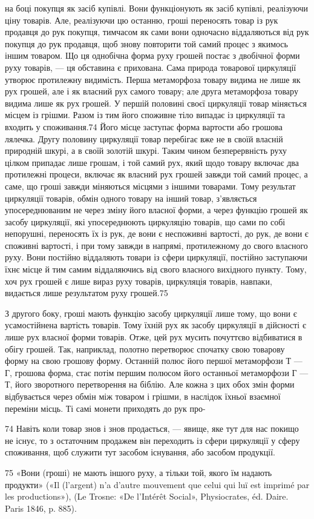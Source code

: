 на боці покупця як засіб купівлі. Вони функціонують як засіб
купівлі, реалізуючи ціну товарів. Але, реалізуючи цю останню,
гроші переносять товар із рук продавця до рук покупця, тимчасом
як сами вони одночасно віддаляються від рук покупця до
рук продавця, щоб знову повторити той самий процес з якимось
іншим товаром. Що ця однобічна форма руху грошей постає з
двобічної форми руху товарів, — ця обставина є прихована. Сама
природа товарової циркуляції утворює протилежну видимість.
Перша метаморфоза товару видима не лише як рух грошей, але
і як власний рух самого товару; але друга метаморфоза товару
видима лише як рух грошей. У першій половині своєї циркуляції
товар міняється місцем із грішми. Разом із тим його споживне
тіло випадає із циркуляції та входить у споживання.74 Його
місце заступає форма вартости або грошова лялечка. Другу
половину циркуляції товар перебігає вже не в своїй власній
природній шкурі, а в своїй золотій шкурі. Таким чином безперервність
руху цілком припадає лише грошам, і той самий рух,
який щодо товару включає два протилежні процеси, включає як
власний рух грошей завжди той самий процес, а саме, що гроші
завжди міняються місцями з іншими товарами. Тому результат
циркуляції товарів, обмін одного товару на інший товар, з’являється
упосереднюваним не через зміну його власної форми, а
через функцію грошей як засобу циркуляції, які упосереднюють
циркуляцію товарів, що сами по собі непорушні, переносять їх
із рук, де вони є неспоживні вартості, до рук, де вони є споживні
вартості, і при тому завжди в напрямі, протилежному до свого
власного руху. Вони постійно віддаляють товари із сфери циркуляції,
постійно заступаючи їхнє місце й тим самим віддаляючись
від свого власного вихідного пункту. Тому, хоч рух грошей є
лише вираз руху товарів, циркуляція товарів, навпаки, видається
лише результатом руху грошей.75

З другого боку, гроші мають функцію засобу циркуляції
лише тому, що вони є усамостійнена вартість товарів. Тому їхній
рух як засобу циркуляції в дійсності є лише рух власної форми
товарів. Отже, цей рух мусить почуттєво відбиватися в обігу
грошей. Так, наприклад, полотно перетворює спочатку свою
товарову форму на свою грошову форму. Останній полюс його
першої метаморфози Т — Г, грошова форма, стає потім першим
полюсом його останньої метаморфози Г — Т, його зворотного
перетворення на біблію. Але кожна з цих обох змін форми відбувається
через обмін між товаром і грішми, в наслідок їхньої
взаємної переміни місць. Ті самі монети приходять до рук про-

74    Навіть коли товар знов і знов продається, — явище, яке тут для нас
покищо не існує, то з остаточним продажем він переходить із сфери циркуляції
у сферу споживання, щоб служити тут засобом існування, або
засобом продукції.

75 «Вони (гроші) не мають іншого руху, а тільки той, якого їм надають
продукти» («Il (l’argent) n’a d’autre mouvement que celui qui luï
est imprimé par les productions»), (Le Trosne: «De l’Intérêt Social»,
Physiocrates, éd. Daire. Paris 1846, p. 885).
